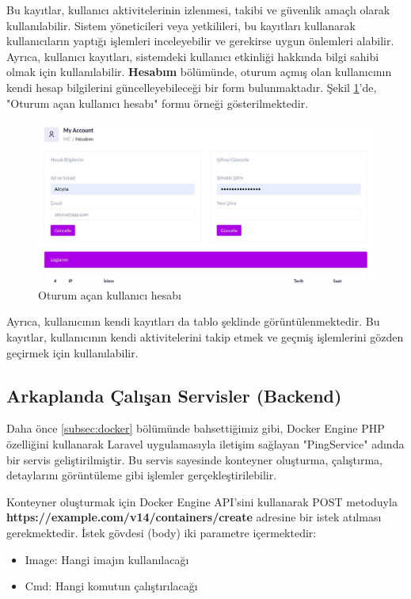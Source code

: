 Bu kayıtlar, kullanıcı aktivitelerinin izlenmesi, takibi ve güvenlik amaçlı olarak kullanılabilir. Sistem yöneticileri veya yetkilileri, bu kayıtları kullanarak kullanıcıların yaptığı işlemleri inceleyebilir ve gerekirse uygun önlemleri alabilir. Ayrıca, kullanıcı kayıtları, sistemdeki kullanıcı etkinliği hakkında bilgi sahibi olmak için kullanılabilir.
\textbf{Hesabım} bölümünde, oturum açmış olan kullanıcının kendi hesap bilgilerini güncelleyebileceği bir form bulunmaktadır. Şekil \ref{fig:account}'de, "Oturum açan kullanıcı hesabı" formu örneği gösterilmektedir.
\begin{figure}[ht]
	\centering
	\includegraphics[width=0.9\linewidth]{images/account.jpeg}
	\caption{Oturum açan kullanıcı hesabı}
	\label{fig:account}
\end{figure}

Ayrıca, kullanıcının kendi kayıtları da tablo şeklinde görüntülenmektedir. Bu kayıtlar, kullanıcının kendi aktivitelerini takip etmek ve geçmiş işlemlerini gözden geçirmek için kullanılabilir.

\subsection{Arkaplanda Çalışan Servisler (Backend)}

Daha önce \ref{subsec:docker} bölümünde bahsettiğimiz gibi, Docker Engine PHP özelliğini kullanarak Laravel uygulamasıyla iletişim sağlayan "PingService" adında bir servis geliştirilmiştir. Bu servis sayesinde konteyner oluşturma, çalıştırma, detaylarını görüntüleme gibi işlemler gerçekleştirilebilir.

Konteyner oluşturmak için Docker Engine API'sini kullanarak POST metoduyla \\ \textbf{https://example.com/v14/containers/create}  adresine bir istek atılması gerekmektedir. İstek gövdesi (body) iki parametre içermektedir:
\begin{itemize}
	\item Image: Hangi imajın kullanılacağı
	\item Cmd: Hangi komutun çalıştırılacağı
\end{itemize}

